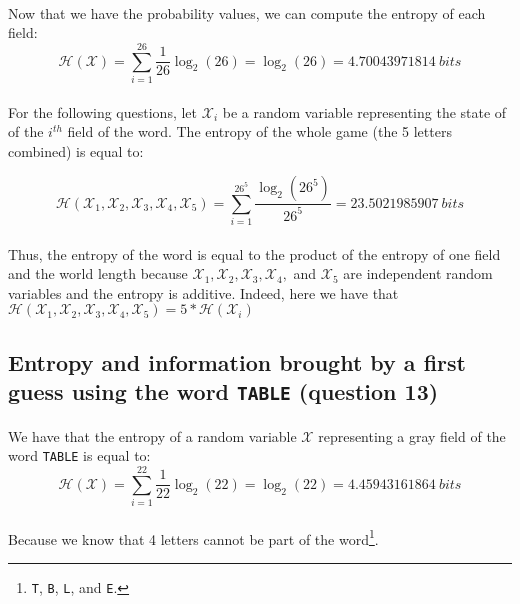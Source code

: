 \documentclass[a4paper, 11pt, oneside]{article}
\begin{document}
\paragraph{}Now that we have the probability values, we can compute the entropy of each field:
$$\mathcal{H}(\mathcal{X}) = \sum_{i=1}^{26} \frac{1}{26} \log_2{(26)} = \log_2{(26)} = 4.70043971814 \ bits$$

\paragraph{}For the following questions, let $\mathcal{X}_i$ be a random variable representing the state of of the $i^{th}$ field of the word. The entropy of the whole game (the 5 letters combined) is equal to:

$$\mathcal{H}(\mathcal{X}_1, \mathcal{X}_2, \mathcal{X}_3, \mathcal{X}_4,\mathcal{X}_5) = \sum_{i = 1}^{26^5} \frac{\log_2(26^5)}{26^5} = 23.5021985907 \ bits $$

\paragraph{}Thus, the entropy of the word is equal to the product of the entropy of one field and the world length because $\mathcal{X}_1, \mathcal{X}_2, \mathcal{X}_3, \mathcal{X}_4,$ and $\mathcal{X}_5$ are independent random variables and the entropy is additive. Indeed, here we have that $\mathcal{H}(\mathcal{X}_1, \mathcal{X}_2, \mathcal{X}_3, \mathcal{X}_4,\mathcal{X}_5) = 5 * \mathcal{H}(\mathcal{X}_i)$

\subsection{Entropy and information brought by a first guess using the word \texttt{TABLE} (question 13)}

\paragraph{}We have that the entropy of a random variable $\mathcal{X}$ representing a gray field of the word \texttt{TABLE} is equal to:
$$\mathcal{H}(\mathcal{X}) = \sum_{i=1}^{22} \frac{1}{22} \log_2{(22)} = \log_2{(22)} = 4.45943161864 \ bits $$
\paragraph{}Because we know that 4 letters cannot be part of the word\footnote{\texttt{T}, \texttt{B}, \texttt{L}, and \texttt{E}.}.
\end{document}
